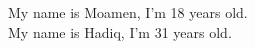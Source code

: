 \documentclass{article}
\newcommand{\INTR}[2][18]{\ttfamily My name is #2, I'm #1 years old.}
\begin{document}
\INTR{Moamen} \\ %
\INTR[31]{Hadiq} %
\end{document}
